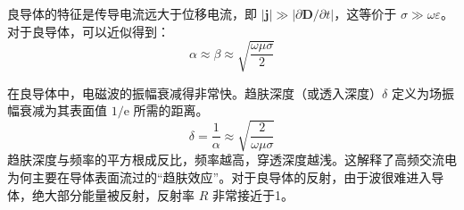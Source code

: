 \documentclass[fontset=none]{ctexart}
\begin{document}
\begin{definition}[良导体]
良导体的特征是传导电流远大于位移电流，即 $|\bm{j}| \gg |\partial\bm{D}/\partial t|$，这等价于 $\sigma \gg \omega\varepsilon$。
对于良导体，可以近似得到：
\begin{equation}
\alpha \approx \beta \approx \sqrt{\frac{\omega\mu\sigma}{2}}
\end{equation}
\end{definition}

\begin{definition}[趋肤深度]
在良导体中，电磁波的振幅衰减得非常快。趋肤深度（或透入深度）$\delta$ 定义为场振幅衰减为其表面值 $1/\mathrm{e}$ 所需的距离。
\begin{equation}
\delta = \frac{1}{\alpha} \approx \sqrt{\frac{2}{\omega\mu\sigma}}
\end{equation}
趋肤深度与频率的平方根成反比，频率越高，穿透深度越浅。这解释了高频交流电为何主要在导体表面流过的“趋肤效应”。对于良导体的反射，由于波很难进入导体，绝大部分能量被反射，反射率 $R$ 非常接近于1。
\end{definition}
\end{document}
